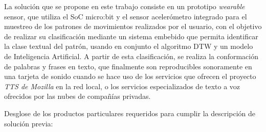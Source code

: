 \hfill \break
\justifying
La solución que se propone en este trabajo consiste en un prototipo \textit{wearable} sensor, que utiliza el SoC micro:bit y el sensor acelerómetro integrado para el muestreo de los patrones de movimientos realizados por el usuario, con el objetivo de realizar su clasificación mediante un sistema embebido que permita identificar la clase textual del patrón, usando en conjunto el algoritmo DTW y un modelo de Inteligencia Artificial. A partir de esta clasificación, se realiza la conformación de palabras y frases en texto, que finalmente son reproducibles sonoramente en una tarjeta de sonido cuando se hace uso de los servicios que ofrecen el proyecto \textit{TTS de Mozilla} en la red local, o los servicios especializados de texto a voz ofrecidos por las nubes de compañías privadas.

\hfill \break
\justifying
Desglose de los productos particulares requeridos para cumplir la descripción de solución previa:
